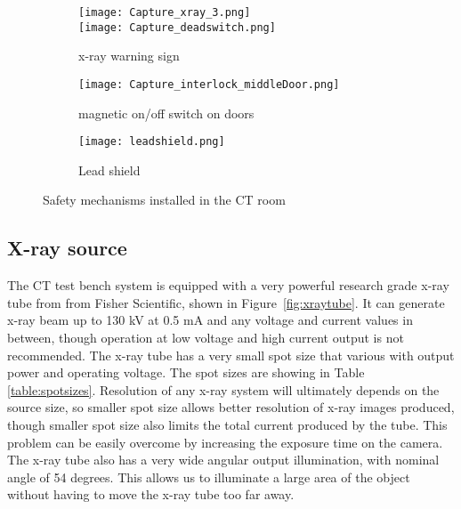 \begin{figure}
	\centering
	\begin{subfigure}[b]{0.3\linewidth}
	\texttt{[image: Capture\_xray\_3.png]} \\
	\vspace{0.2cm}
	\texttt{[image: Capture\_deadswitch.png]}
	\caption{x-ray warning sign}
	\label{fig:xraywarningsign}
	\end{subfigure}
\hspace{0.2cm}
	\begin{subfigure}[b]{0.3\linewidth}
	\centering
	\texttt{[image: Capture\_interlock\_middleDoor.png]}
	\caption{magnetic on/off switch on doors}
	\label{fig:doorinterlock}
	\end{subfigure}
\hspace{0.2cm}
	\begin{subfigure}[b]{0.3\linewidth}
	\centering
	\texttt{[image: leadshield.png]}
	\caption{Lead shield}
	\label{fig:leadshield}
	\end{subfigure}
\caption{Safety mechanisms installed in the CT room}
\label{fig:safety}
\end{figure}


\subsection{X-ray source}
The CT test bench system is equipped with a very powerful research grade x-ray tube from from Fisher Scientific, shown in Figure~\ref{fig:xraytube}.  It can generate x-ray beam up to 130 kV at 0.5 mA and any voltage and current values in between, though operation at low voltage and high current output is not recommended.  The x-ray tube has a very small spot size that various with output power and operating voltage.  The spot sizes are showing in Table \ref{table:spotsizes}.  Resolution of any x-ray system will ultimately depends on the source size, so smaller spot size allows better resolution of x-ray images produced, though smaller spot size also limits the total current produced by the tube.  This problem can be easily overcome by increasing the exposure time on the camera.  The x-ray tube also has a very wide angular output illumination, with nominal angle of 54 degrees.  This allows us to illuminate a large area of the object without having to move the x-ray tube too far away.  

\begin{figure}
\begin{floatrow}
\end{floatrow}
\end{figure}

